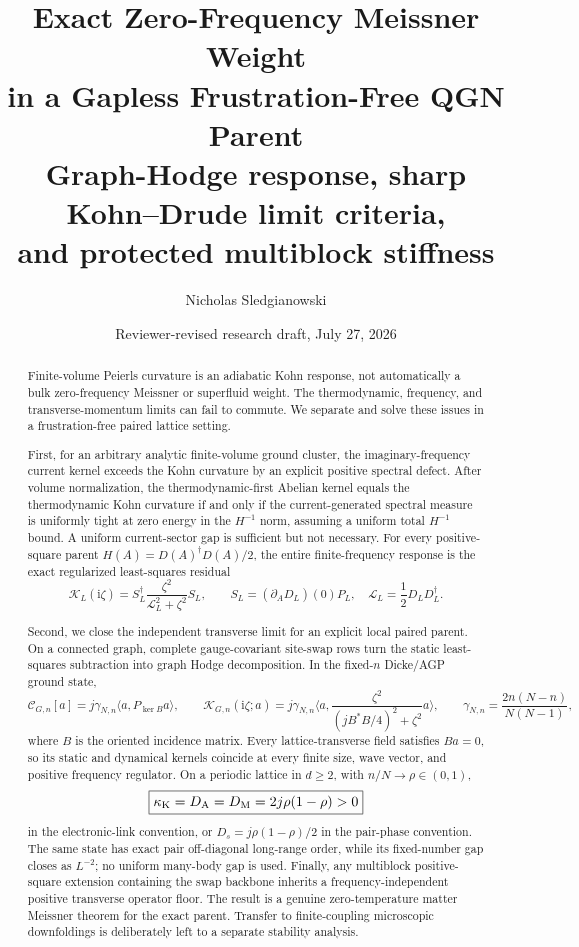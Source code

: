 \documentclass[11pt]{article}
\title{\textbf{Exact Zero-Frequency Meissner Weight\\
in a Gapless Frustration-Free QGN Parent}\\[0.35em]
\large Graph-Hodge response, sharp Kohn--Drude limit criteria,\\
and protected multiblock stiffness}
\author{Nicholas Sledgianowski}
\date{Reviewer-revised research draft, July 27, 2026}
\theoremstyle{definition}
\theoremstyle{remark}
\newcommand{\cK}{\mathcal K}
\newcommand{\cC}{\mathcal C}
\newcommand{\cL}{\mathcal L}
\newcommand{\I}{\mathrm i}
\newcommand{\ip}[2]{\langle #1,#2\rangle}
\begin{document}
\maketitle

\begin{abstract}
Finite-volume Peierls curvature is an adiabatic Kohn response, not automatically a bulk zero-frequency
Meissner or superfluid weight.  The thermodynamic, frequency, and transverse-momentum limits can fail
to commute.  We separate and solve these issues in a frustration-free paired lattice setting.

First, for an arbitrary analytic finite-volume ground cluster, the imaginary-frequency current kernel
exceeds the Kohn curvature by an explicit positive spectral defect.  After volume normalization, the
thermodynamic-first Abelian kernel equals the thermodynamic Kohn curvature if and only if the
current-generated spectral measure is uniformly tight at zero energy in the $H^{-1}$ norm, assuming a
uniform total $H^{-1}$ bound.  A uniform current-sector gap is sufficient but not necessary.  For every
positive-square parent $H(A)=D(A)^\dagger D(A)/2$, the entire finite-frequency response is the exact
regularized least-squares residual
\[
 \cK_L(\I\zeta)
 =S_L^\dagger\frac{\zeta^2}{\cL_L^2+\zeta^2}S_L,
 \qquad
 S_L=(\partial_A D_L)(0)P_L,
 \quad
 \cL_L=\frac12D_LD_L^\dagger.
\]

Second, we close the independent transverse limit for an explicit local paired parent.  On a connected
graph, complete gauge-covariant site-swap rows turn the static least-squares subtraction into graph Hodge
decomposition.  In the fixed-$n$ Dicke/AGP ground state,
\[
 \cC_{G,n}[a]
 =j\gamma_{N,n}\ip{a}{P_{\ker B}a},
 \qquad
 \cK_{G,n}(\I\zeta;a)
 =j\gamma_{N,n}\ip{a}{
 \frac{\zeta^2}{(jB^*B/4)^2+\zeta^2}a},
 \qquad
 \gamma_{N,n}=\frac{2n(N-n)}{N(N-1)},
\]
where $B$ is the oriented incidence matrix.  Every lattice-transverse field satisfies $Ba=0$, so its
static and dynamical kernels coincide at every finite size, wave vector, and positive frequency regulator.
On a periodic lattice in $d\ge2$, with $n/N\to\rho\in(0,1)$,
\[
 \boxed{\kappa_{\rm K}=D_{\rm A}=D_{\rm M}=2j\rho(1-\rho)>0}
\]
in the electronic-link convention, or $D_s=j\rho(1-\rho)/2$ in the pair-phase convention.  The same
state has exact pair off-diagonal long-range order, while its fixed-number gap closes as $L^{-2}$; no
uniform many-body gap is used.  Finally, any multiblock positive-square extension containing the swap
backbone inherits a frequency-independent positive transverse operator floor.  The result is a genuine
zero-temperature matter Meissner theorem for the exact parent.  Transfer to finite-coupling microscopic
downfoldings is deliberately left to a separate stability analysis.
\end{abstract}
\end{document}
